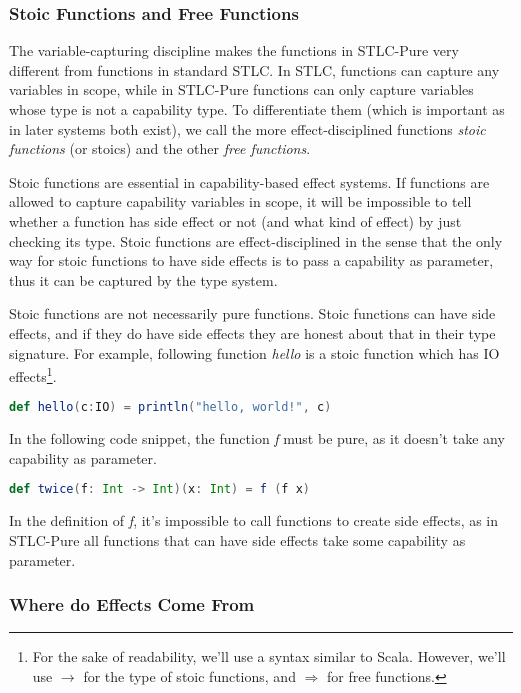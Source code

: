 \subsubsection{Stoic Functions and Free Functions}

The variable-capturing discipline makes the functions in STLC-Pure
very different from functions in standard STLC. In STLC, functions can
capture any variables in scope, while in STLC-Pure functions can only
capture variables whose type is not a capability type. To
differentiate them (which is important as in later systems both
exist), we call the more effect-disciplined functions \emph{stoic
  functions} (or stoics) and the other \emph{free functions}.

Stoic functions are essential in capability-based effect systems. If
functions are allowed to capture capability variables in scope, it
will be impossible to tell whether a function has side effect or not
(and what kind of effect) by just checking its type. Stoic functions
are effect-disciplined in the sense that the only way for stoic
functions to have side effects is to pass a capability as parameter,
thus it can be captured by the type system.

Stoic functions are not necessarily pure functions. Stoic functions
can have side effects, and if they do have side effects they are
honest about that in their type signature. For example, following
function \emph{hello} is a stoic function which has IO
effects\footnote{For the sake of readability, we'll use a syntax
  similar to Scala. However, we'll use $\to$ for the type of stoic
  functions, and $\Rightarrow$ for free functions.}.

\begin{lstlisting}[language=Scala]
  def hello(c:IO) = println("hello, world!", c)
\end{lstlisting}

In the following code snippet, the function \emph{f} must be pure, as
it doesn't take any capability as parameter.

\begin{lstlisting}[language=Scala]
  def twice(f: Int -> Int)(x: Int) = f (f x)
\end{lstlisting}

In the definition of \emph{f}, it's impossible to call functions to
create side effects, as in STLC-Pure all functions that can have side
effects take some capability as parameter.

\subsubsection{Where do Effects Come From}

